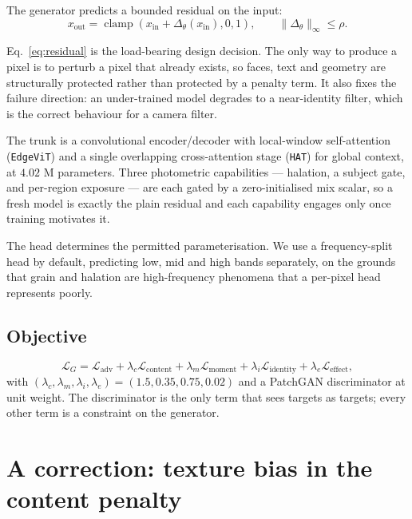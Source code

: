 \documentclass[11pt,a4paper]{article}
\newcommand{\code}[1]{\texttt{#1}}
\begin{document}
The generator predicts a bounded residual on the input:
\begin{equation}
  x_{\text{out}} = \operatorname{clamp}\!\left(x_{\text{in}} + \Delta_\theta(x_{\text{in}}), 0, 1\right),
  \qquad \lVert\Delta_\theta\rVert_\infty \le \rho .
  \label{eq:residual}
\end{equation}

Eq.~\eqref{eq:residual} is the load-bearing design decision. The only way to
produce a pixel is to perturb a pixel that already exists, so faces, text and
geometry are structurally protected rather than protected by a penalty term. It
also fixes the failure direction: an under-trained model degrades to a
near-identity filter, which is the correct behaviour for a camera filter.

The trunk is a convolutional encoder/decoder with local-window self-attention
(\code{EdgeViT}) and a single overlapping cross-attention stage (\code{HAT}) for
global context, at $4.02$ M parameters. Three photometric capabilities --- halation,
a subject gate, and per-region exposure --- are each gated by a
zero-initialised mix scalar, so a fresh model is exactly the plain residual and
each capability engages only once training motivates it.

The head determines the permitted parameterisation. We use a frequency-split head
by default, predicting low, mid and high bands separately, on the grounds that
grain and halation are high-frequency phenomena that a per-pixel head
represents poorly.

\subsection{Objective}

\begin{equation}
  \mathcal{L}_G = \mathcal{L}_{\mathrm{adv}} + \lambda_c \mathcal{L}_{\mathrm{content}}
  + \lambda_m \mathcal{L}_{\mathrm{moment}} + \lambda_i \mathcal{L}_{\mathrm{identity}}
  + \lambda_e \mathcal{L}_{\mathrm{effect}},
  \label{eq:obj}
\end{equation}
with $(\lambda_c, \lambda_m, \lambda_i, \lambda_e) = (1.5, 0.35, 0.75, 0.02)$ and a
PatchGAN discriminator at unit weight. The discriminator is the only term that
sees targets as targets; every other term is a constraint on the generator.

\section{A correction: texture bias in the content penalty}
\label{sec:loss}
\end{document}
